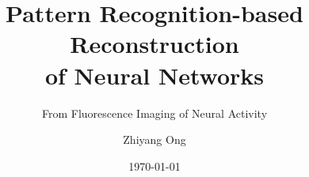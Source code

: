 \documentclass[xcolor={usenames,dvipsnames},hyperref={hyperindex,bookmarks}]{beamer}
\begin{document}

{

	\title[Cover] %
	{Pattern Recognition-based Reconstruction \\of Neural Networks}
	\subtitle{From Fluorescence Imaging of Neural Activity}
	\author[Author, Anders] %
	{Zhiyang Ong}%
	\date{\today} %
	\frame{\titlepage}
}








\end{document}

